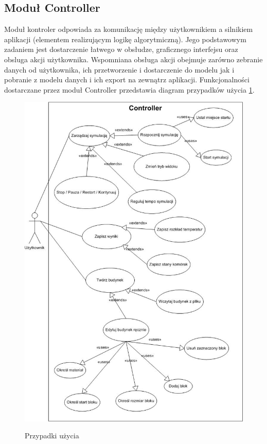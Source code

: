 \subsection{Moduł Controller}
Moduł kontroler odpowiada za komunikację między użytkownikiem a silnikiem aplikacji (elementem realizującym logikę algorytmiczną). 
Jego podstawowym zadaniem jest dostarczenie łatwego w obsłudze, graficznego interfejsu oraz 
obsluga akcji użytkownika. Wspomniana obsługa akcji obejmuje zarówno zebranie danych od użytkownika, ich przetworzenie
i dostarczenie do modelu jak i pobranie z modelu danych i ich export na zewnątrz aplikacji.
Funkcjonalności dostarczane przez moduł Controller przedstawia diagram przypadków użycia \ref{przypadki uzycia}.
\begin{figure}
\begin {center}
\includegraphics{useCase.jpg} \\
\caption { Przypadki użycia}
\label {przypadki uzycia}
\end {center}
\end{figure}


